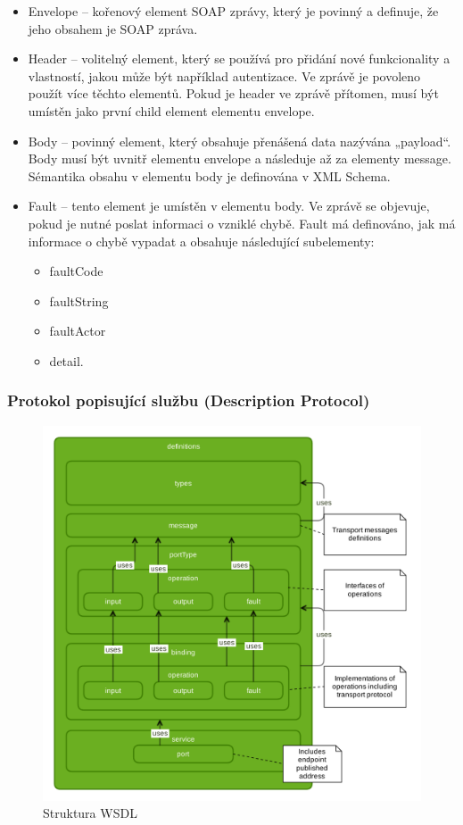 \documentclass[11pt,twoside,a4paper]{book}
\begin{document}
\begin{itemize}
\item Envelope – kořenový element SOAP zprávy, který je povinný a definuje, že jeho
obsahem je SOAP zpráva.

\item Header –
volitelný element, který se používá pro přidání nové funkcionality a
vlastností, jakou může být například autentizace. Ve zprávě je povoleno použít více
těchto elementů. Pokud je header ve zprávě přítomen, musí být umístěn jako první
child element elementu envelope.
 
\item Body – povinný element, který obsahuje přenášená data nazývána „payload“. Body
musí být uvnitř elementu envelope a následuje až za elementy message. Sémantika
obsahu v elementu body je definována v XML Schema.

\item Fault – tento element je umístěn v elementu body. Ve zprávě se objevuje, pokud je
nutné poslat informaci o vzniklé chybě. Fault má definováno, jak má informace o
chybě vypadat a obsahuje následující subelementy:

\begin{itemize}
  \item faultCode
  \item faultString
  \item faultActor
  \item detail.
\end{itemize}
\end{itemize}

\subsubsection{Protokol popisující službu (Description Protocol)}

\begin{figure}[h]
\begin{center}
\includegraphics[width=12cm]{images-pdf/wsdl.pdf} 
\caption{Struktura WSDL}
\label{fig:logo}
\end{center}
\end{figure}
\end{document}
